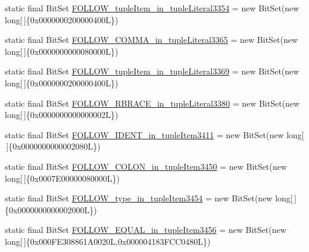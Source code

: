 \begin{DoxyCompactItemize}
static final Bit\-Set \hyperlink{classorg_1_1tzi_1_1use_1_1parser_1_1testsuite_1_1_test_suite_parser_ad2ac76cd16c14ba54d7f7ee75e845774}{F\-O\-L\-L\-O\-W\-\_\-tuple\-Item\-\_\-in\-\_\-tuple\-Literal3354} = new Bit\-Set(new long\mbox{[}$\,$\mbox{]}\{0x0000000200000400\-L\})
\item 
static final Bit\-Set \hyperlink{classorg_1_1tzi_1_1use_1_1parser_1_1testsuite_1_1_test_suite_parser_a2c2733eabe90fbbb834602695c78da3c}{F\-O\-L\-L\-O\-W\-\_\-\-C\-O\-M\-M\-A\-\_\-in\-\_\-tuple\-Literal3365} = new Bit\-Set(new long\mbox{[}$\,$\mbox{]}\{0x0000000000080000\-L\})
\item 
static final Bit\-Set \hyperlink{classorg_1_1tzi_1_1use_1_1parser_1_1testsuite_1_1_test_suite_parser_afdfbe71eb990b623756ab337b9e0f01a}{F\-O\-L\-L\-O\-W\-\_\-tuple\-Item\-\_\-in\-\_\-tuple\-Literal3369} = new Bit\-Set(new long\mbox{[}$\,$\mbox{]}\{0x0000000200000400\-L\})
\item 
static final Bit\-Set \hyperlink{classorg_1_1tzi_1_1use_1_1parser_1_1testsuite_1_1_test_suite_parser_a856fb8d27e2b67bd72b7c8e49ba9aee6}{F\-O\-L\-L\-O\-W\-\_\-\-R\-B\-R\-A\-C\-E\-\_\-in\-\_\-tuple\-Literal3380} = new Bit\-Set(new long\mbox{[}$\,$\mbox{]}\{0x0000000000000002\-L\})
\item 
static final Bit\-Set \hyperlink{classorg_1_1tzi_1_1use_1_1parser_1_1testsuite_1_1_test_suite_parser_a9c6b422c81ff56993605fa8c009f006f}{F\-O\-L\-L\-O\-W\-\_\-\-I\-D\-E\-N\-T\-\_\-in\-\_\-tuple\-Item3411} = new Bit\-Set(new long\mbox{[}$\,$\mbox{]}\{0x0000000000002080\-L\})
\item 
static final Bit\-Set \hyperlink{classorg_1_1tzi_1_1use_1_1parser_1_1testsuite_1_1_test_suite_parser_adbe8d6e41b7ab446cf13de76671b787b}{F\-O\-L\-L\-O\-W\-\_\-\-C\-O\-L\-O\-N\-\_\-in\-\_\-tuple\-Item3450} = new Bit\-Set(new long\mbox{[}$\,$\mbox{]}\{0x0007\-E00000080000\-L\})
\item 
static final Bit\-Set \hyperlink{classorg_1_1tzi_1_1use_1_1parser_1_1testsuite_1_1_test_suite_parser_aab0e10048ba6cb402e5de72cc317fa31}{F\-O\-L\-L\-O\-W\-\_\-type\-\_\-in\-\_\-tuple\-Item3454} = new Bit\-Set(new long\mbox{[}$\,$\mbox{]}\{0x0000000000002000\-L\})
\item 
static final Bit\-Set \hyperlink{classorg_1_1tzi_1_1use_1_1parser_1_1testsuite_1_1_test_suite_parser_a598ed29376690e4919d0ec6628350e88}{F\-O\-L\-L\-O\-W\-\_\-\-E\-Q\-U\-A\-L\-\_\-in\-\_\-tuple\-Item3456} = new Bit\-Set(new long\mbox{[}$\,$\mbox{]}\{0x000\-F\-E308861\-A0020\-L,0x000004183\-F\-C\-C0480\-L\})
\item 

\end{DoxyCompactItemize}
